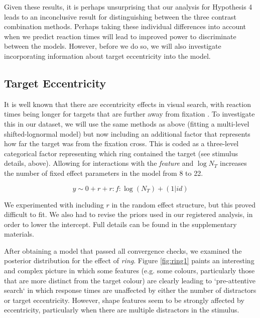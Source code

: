 \documentclass[preprint,12pt,authoryear]{elsarticle}
\begin{document}
Given these results, it is perhaps unsurprising that our analysis for Hypothesis 4 leads to an inconclusive result for distinguishing between the three contrast combination methods. Perhaps taking these individual differences into account when we predict reaction times will lead to improved power to discriminate between the models. However, before we do so, we will also investigate incorporating information about target eccentricity into the model.

\subsection{Target Eccentricity}

It is well known that there are eccentricity effects in visual search, with reaction times being longer for targets that are further away from fixation \citep{carrasco1995eccentricity}. To investigate this in our dataset, we will use the same methods as above (fitting a multi-level shifted-lognormal model) but now including an additional factor that represents how far the target was from the fixation cross. This is coded as a three-level categorical factor representing which ring contained the target (see stimulus details, above). Allowing for interactions with the \textit{feature} and $\log{N_T}$ increases the number of fixed effect parameters in the model from 8 to 22. 

\begin{equation}
y \sim 0 + r + r:f:\log(N_T) + (1|id)
\end{equation}

We experimented with including $r$ in the random effect structure, but this proved difficult to fit. We also had to revise the priors used in our registered analysis, in order to lower the intercept. Full details can be found in the supplementary materials. 

After obtaining a model that passed all convergence checks, we examined the posterior distribution for the effect of \textit{ring}. Figure \ref{fig:ring1} paints an interesting and complex picture in which some features (e.g. some colours, particularly those that are more distinct from the target colour) are clearly leading to `pre-attentive search` in which response times are unaffected by either the number of distractors or target eccentricity. However, shape features seem to be strongly affected by eccentricity, particularly when there are multiple distractors in the stimulus.
\end{document}
